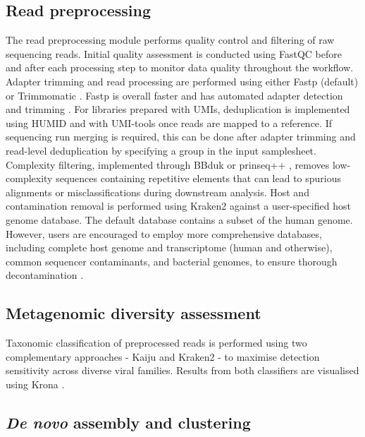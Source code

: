 \subsection{Read preprocessing}

The read preprocessing module performs quality control and filtering of raw sequencing reads. Initial quality assessment is conducted using FastQC before and after each processing step to monitor data quality throughout the workflow. Adapter trimming and read processing are performed using either Fastp \cite{Chen2018-tu} (default) or Trimmomatic \cite{Bolger2014-si}. Fastp is overall faster and has automated adapter detection and trimming \cite{Chen2018-tu}. For libraries prepared with UMIs, deduplication is implemented using HUMID \cite{LarosUnknown-nx} and with UMI-tools \cite{Smith2017-nk} once reads are mapped to a reference. If sequencing run merging is required, this can be done after adapter trimming and read-level deduplication by specifying a group in the input samplesheet. Complexity filtering, implemented through BBduk \cite{BushnellUnknown-qy} or prinseq++ \cite{Cantu2019-vs}, removes low-complexity sequences containing repetitive elements that can lead to spurious alignments or misclassifications during downstream analysis. Host and contamination removal is performed using Kraken2 \cite{Wood2019-jl} against a user-specified host genome database. The default database contains a subset of the human genome. However, users are encouraged to employ more comprehensive databases, including complete host genome and transcriptome (human and otherwise), common sequencer contaminants, and bacterial genomes, to ensure thorough decontamination \cite{Forbes2025-mv}.

\subsection{Metagenomic diversity assessment}

Taxonomic classification of preprocessed reads is performed using two complementary approaches - Kaiju \cite{Menzel2016-tz} and Kraken2 \cite{Wood2019-jl} - to maximise detection sensitivity across diverse viral families. Results from both classifiers are visualised using Krona \cite{Ondov2011-yp}.

\subsection{\textit{De novo} assembly and clustering}

